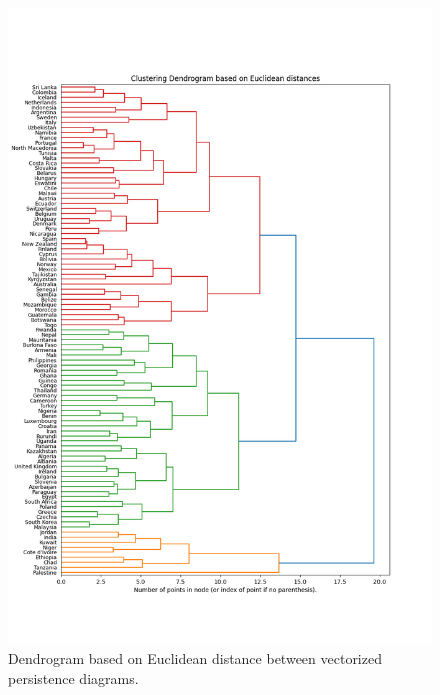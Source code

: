 \documentclass[12pt]{article}
\begin{document}
\begin{figure}[t]
	\centering
	\includegraphics[width=15cm]{euclidean.png}
	\caption{Dendrogram based on Euclidean distance between vectorized persistence diagrams.}
\end{figure}
\end{document}
